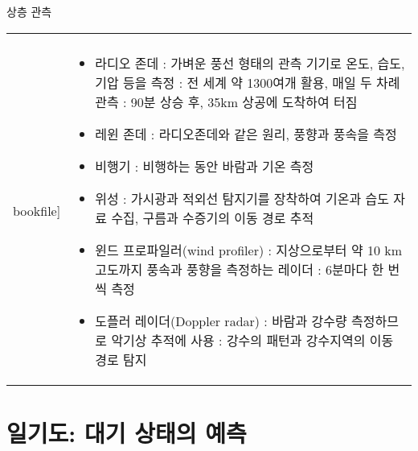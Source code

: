\begin{frame}[t]{상층 관측}
	\begin{tabular}{ll}
		\begin{minipage}[t]{0.4\textwidth}\scriptsize
			\begin{figure}[t]
				\texttt{[image: \\bookfile]}
			\end{figure}
		\end{minipage}	
		&
		\begin{minipage}[t]{0.55\textwidth} \scriptsize	
			\begin{itemize}
				\item 라디오 존데 
				: 가벼운 풍선 형태의 관측 기기로 온도, 습도, 기압 등을
				  측정
				: 전 세계 약 1300여개 활용, 매일 두 차례 관측      
				: 90분 상승 후, 35km 상공에 도착하여 터짐
		  
				\item 레윈 존데
				: 라디오존데와 같은 원리, 풍향과 풍속을 측정
		  
				\item 비행기 
				: 비행하는 동안 바람과 기온 측정
		  
				\item 위성
				: 가시광과 적외선 탐지기를 장착하여 기온과 습도 자료
				  수집, 구름과 수증기의 이동 경로 추적

				\item 윈드 프로파일러(wind profiler)
				  : 지상으로부터 약 10 km 고도까지 풍속과
				   풍향을 측정하는 레이더
				  : 6분마다 한 번씩 측정
			 
				\item 도플러 레이더(Doppler radar)
				  : 바람과 강수량 측정하므로 악기상 추적에
				   사용
				  : 강수의 패턴과 강수지역의 이동 경로 탐지
			 
					  
			\end{itemize}

		\end{minipage}
	\end{tabular}
\end{frame}




\section{일기도: 대기 상태의 예측}



